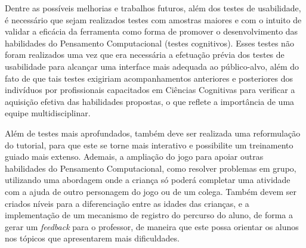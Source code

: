 Dentre as possíveis melhorias e trabalhos futuros, além dos testes de usabilidade, é necessário que sejam realizados testes com amostras maiores e com o intuito de validar a eficácia da ferramenta como forma de promover o desenvolvimento das habilidades do Pensamento Computacional (testes cognitivos). Esses testes não foram realizados uma vez que era necessária a efetuação prévia dos testes de usabilidade para alcançar uma interface mais adequada ao público-alvo, além do fato de que tais testes exigiriam acompanhamentos anteriores e posteriores dos indivíduos por profissionais capacitados em Ciências Cognitivas para verificar a aquisição efetiva das habilidades propostas, o que reflete a importância de uma equipe multidisciplinar. 

Além de testes mais aprofundados, também deve ser realizada uma reformulação do tutorial, para que este se torne mais interativo e possibilite um treinamento guiado mais extenso. Ademais, a ampliação do jogo para apoiar outras habilidades do Pensamento Computacional, como resolver problemas em grupo, utilizando uma abordagem onde a criança só poderá completar uma atividade com a ajuda de outro personagem do jogo ou de um colega. Também devem ser criados níveis para a diferenciação entre as idades das crianças, e a implementação de um mecanismo de registro do percurso do aluno, de forma a gerar um \textit{feedback} para o professor, de maneira que este possa orientar os alunos nos tópicos que apresentarem mais dificuldades.